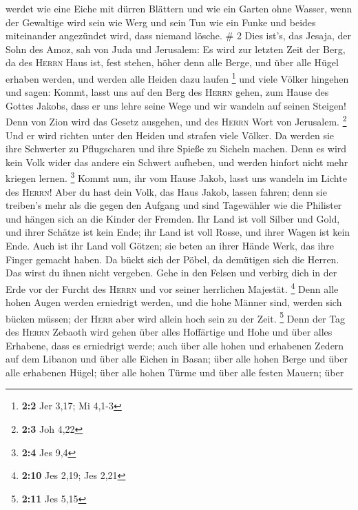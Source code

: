 werdet wie eine Eiche mit dürren Blättern und wie ein Garten ohne
Wasser,  wenn der Gewaltige wird sein wie Werg und sein
Tun wie ein Funke und beides miteinander angezündet wird, dass niemand
lösche. \# 2  Dies ist's, das Jesaja, der Sohn des Amoz,
sah von Juda und Jerusalem:  Es wird zur letzten Zeit der
Berg, da des \textsc{Herrn} Haus ist, fest stehen, höher denn alle
Berge, und über alle Hügel erhaben werden, und werden alle Heiden dazu
laufen \footnote{\textbf{2:2} Jer 3,17; Mi 4,1-3}  und
viele Völker hingehen und sagen: Kommt, lasst uns auf den Berg des
\textsc{Herrn} gehen, zum Hause des Gottes Jakobs, dass er uns lehre
seine Wege und wir wandeln auf seinen Steigen! Denn von Zion wird das
Gesetz ausgehen, und des \textsc{Herrn} Wort von Jerusalem. \footnote{\textbf{2:3}
  Joh 4,22}  Und er wird richten unter den Heiden und
strafen viele Völker. Da werden sie ihre Schwerter zu Pflugscharen und
ihre Spieße zu Sicheln machen. Denn es wird kein Volk wider das andere
ein Schwert aufheben, und werden hinfort nicht mehr kriegen lernen.
\footnote{\textbf{2:4} Jes 9,4}  Kommt nun, ihr vom Hause
Jakob, lasst uns wandeln im Lichte des \textsc{Herrn}! 
Aber du hast dein Volk, das Haus Jakob, lassen fahren; denn sie
treiben's mehr als die gegen den Aufgang und sind Tagewähler wie die
Philister und hängen sich an die Kinder der Fremden.  Ihr
Land ist voll Silber und Gold, und ihrer Schätze ist kein Ende; ihr Land
ist voll Rosse, und ihrer Wagen ist kein Ende.  Auch ist
ihr Land voll Götzen; sie beten an ihrer Hände Werk, das ihre Finger
gemacht haben.  Da bückt sich der Pöbel, da demütigen sich
die Herren. Das wirst du ihnen nicht vergeben.  Gehe in
den Felsen und verbirg dich in der Erde vor der Furcht des
\textsc{Herrn} und vor seiner herrlichen Majestät. \footnote{\textbf{2:10}
  Jes 2,19; Jes 2,21}  Denn alle hohen Augen werden
erniedrigt werden, und die hohe Männer sind, werden sich bücken müssen;
der \textsc{Herr} aber wird allein hoch sein zu der Zeit. \footnote{\textbf{2:11}
  Jes 5,15}  Denn der Tag des \textsc{Herrn} Zebaoth wird
gehen über alles Hoffärtige und Hohe und über alles Erhabene, dass es
erniedrigt werde;  auch über alle hohen und erhabenen
Zedern auf dem Libanon und über alle Eichen in Basan; 
über alle hohen Berge und über alle erhabenen Hügel; 
über alle hohen Türme und über alle festen Mauern;  über

